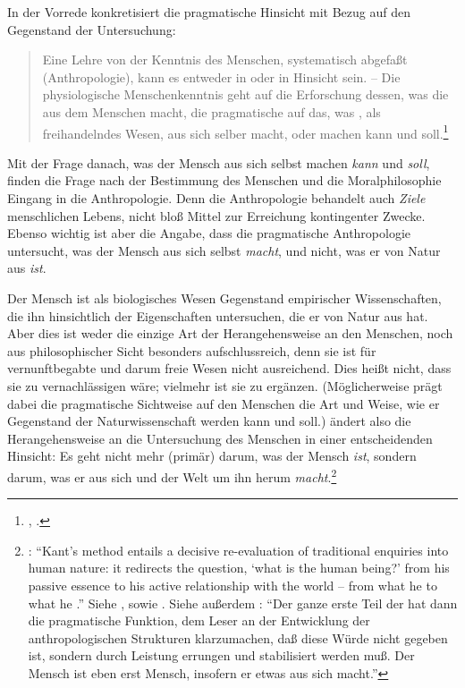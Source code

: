 In der Vorrede konkretisiert  die pragmatische Hinsicht mit Bezug auf den Gegenstand
der Untersuchung:
\begin{quote}
  Eine Lehre von der Kenntnis des Menschen, systematisch abgefaßt
  (Anthropologie), kann es entweder in  oder in
   Hinsicht sein. -- Die physiologische Menschenkenntnis geht
  auf die Erforschung dessen, was die  aus dem Menschen macht, die
  pragmatische auf das, was , als freihandelndes Wesen, aus sich selber
  macht, oder machen kann und
  soll.\footnote{\cite[][BA~iv]{Kant:AnthropologieinpragmatischerHinsicht1977},
  \cite[][VII: 119.9--14]{Kant:GesammelteWerke1900ff.}.}
\end{quote}
Mit der Frage danach, was der Mensch aus sich selbst machen \emph{kann} und
\emph{soll}, finden die Frage nach der Bestimmung des Menschen und die
Moralphilosophie Eingang in die Anthropologie. Denn die Anthropologie behandelt
auch \emph{Ziele} menschlichen Lebens, nicht bloß Mittel zur Erreichung
kontingenter Zwecke. Ebenso wichtig ist aber die Angabe, dass die pragmatische
Anthropologie untersucht, was der Mensch aus sich selbst \emph{macht}, und
nicht, was er von Natur aus \emph{ist}.


Der Mensch ist als biologisches Wesen Gegenstand empirischer Wissenschaften, die
ihn hinsichtlich der Eigenschaften untersuchen, die er von Natur aus hat. Aber
dies ist weder die einzige Art der Herangehensweise an den Menschen, noch aus
philosophischer Sicht besonders aufschlussreich, denn sie ist für
vernunftbegabte und darum freie Wesen nicht ausreichend. Dies heißt nicht, dass
sie zu vernachlässigen wäre; vielmehr ist sie zu ergänzen. (Möglicherweise prägt
dabei die pragmatische Sichtweise auf den Menschen die Art und Weise, wie er
Gegenstand der Naturwissenschaft werden kann und soll.) 
ändert also die Herangehensweise an die
Untersuchung des Menschen in einer entscheidenden Hinsicht: Es geht nicht mehr
(primär) darum, was der Mensch \emph{ist}, sondern darum, was er aus sich und
der Welt um ihn herum
\emph{macht}.\footnote{\cite[Vgl.][61]{Cohen:KantandtheHumanSciences2009}:
\enquote{Kant's method entails a decisive re-evaluation of traditional enquiries
into human nature: it redirects the question, \enquote{what is the human being?}
from his passive essence to his active relationship with the world -- from what
he  to what he .} Siehe
\cite[35--61]{Cohen:KantandtheHumanSciences2009}, sowie \cite{Mengusoglu:DerBegriffdesMenschenbeiKant1966}.
Siehe außerdem
\cite[][275]{Boehme:AnthropologieinpragmatischerHinsicht1985}:
\enquote{Der ganze erste Teil der  hat dann die pragmatische
Funktion, dem Leser an der Entwicklung der anthropologischen Strukturen
klarzumachen, daß diese Würde nicht gegeben ist, sondern durch Leistung errungen
und stabilisiert werden muß. Der Mensch ist eben erst Mensch, insofern er etwas
aus sich macht.}}


